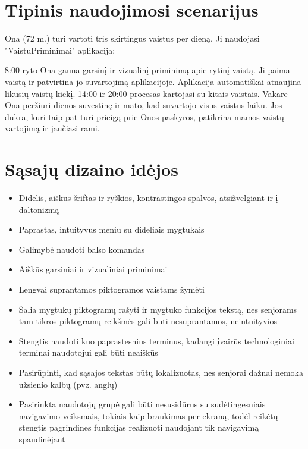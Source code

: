 \documentclass[14pt]{extarticle}
\begin{document}
\clearpage

\section{Tipinis naudojimosi scenarijus}

Ona (72 m.) turi vartoti tris skirtingus vaistus per dieną. Ji naudojasi "VaistuPriminimai" aplikacija:

8:00 ryto Ona gauna garsinį ir vizualinį priminimą apie rytinį vaistą.
Ji paima vaistą ir patvirtina jo suvartojimą aplikacijoje.
Aplikacija automatiškai atnaujina likusių vaistų kiekį.
14:00 ir 20:00 procesas kartojasi su kitais vaistais.
Vakare Ona peržiūri dienos suvestinę ir mato, kad suvartojo visus vaistus laiku.
Jos dukra, kuri taip pat turi prieigą prie Onos paskyros, patikrina mamos vaistų vartojimą ir jaučiasi rami.

\clearpage

\section{Sąsajų dizaino idėjos}

\begin{itemize}
	\item Didelis, aiškus šriftas ir ryškios, kontrastingos spalvos, atsižvelgiant ir į daltonizmą
	\item Paprastas, intuityvus meniu su dideliais mygtukais
	\item Galimybė naudoti balso komandas
	\item Aiškūs garsiniai ir vizualiniai priminimai
	\item Lengvai suprantamos piktogramos vaistams žymėti
	\item Šalia mygtukų piktogramų rašyti ir mygtuko funkcijos tekstą, nes senjorams tam tikros piktogramų reikšmės gali būti nesuprantamos, neintuityvios
	\item Stengtis naudoti kuo paprastesnius terminus, kadangi įvairūs technologiniai terminai naudotojui gali būti neaiškūs
	\item Pasirūpinti, kad sąsajos tekstas būtų lokalizuotas, nes senjorai dažnai nemoka užsienio kalbų (pvz. anglų)
	\item Pasirinkta naudotojų grupė gali būti nesusidūrus su sudėtingesniais navigavimo veiksmais, tokiais kaip braukimas per ekraną, todėl reikėtų stengtis pagrindines funkcijas realizuoti naudojant tik navigavimą spaudinėjant
\end{itemize}
\end{document}
